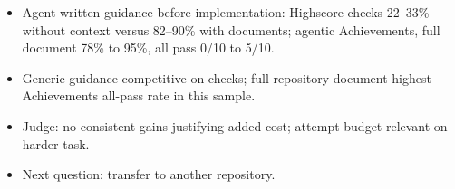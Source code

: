 \begin{itemize}
\item Agent-written guidance before implementation: Highscore checks
22--33\% without context versus 82--90\% with documents;
agentic Achievements, full document 78\% to 95\%, all pass 0/10 to 5/10.
\item Generic guidance competitive on checks; full repository document
highest Achievements all-pass rate in this sample.
\item Judge: no consistent gains justifying added cost;
attempt budget relevant on harder task.
\item Next question: transfer to another repository.
\end{itemize}
